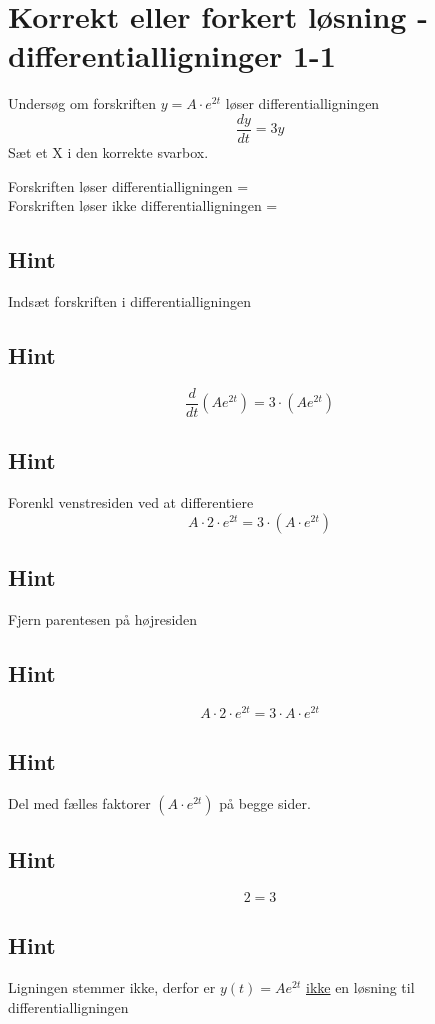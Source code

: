 \documentclass{article}
\newenvironment{exercise}[1]{\newpage\section{#1}}{}
\newcommand{\answerbox}[1]{\fbox{$#1$}}
\newcommand{\hint}{\subsection*{Hint}}
\begin{document}
\tableofcontents
\newpage

\begin{exercise}{Korrekt eller forkert løsning - differentialligninger 1-1}


Undersøg om forskriften $y = A \cdot e^{2t}$ løser differentialligningen
\[
\frac{dy}{dt} = 3y
\]
Sæt et X i den korrekte svarbox.

Forskriften løser differentialligningen = \answerbox{} \\

Forskriften løser ikke differentialligningen = \answerbox{X}

\hint

Indsæt forskriften i differentialligningen

\hint
\[
\frac{d}{dt} \left( A e^{2t}\right) = 3 \cdot \left( A e^{2t} \right)
\]


\hint

Forenkl venstresiden ved at differentiere
\[
A \cdot 2 \cdot e^{2t} = 3 \cdot \left(A \cdot e^{2t} \right)
\]

\hint

Fjern parentesen på højresiden

\hint
\[
A \cdot 2 \cdot e^{2t} = 3 \cdot A \cdot e^{2t}
\]

\hint
Del med fælles faktorer $\left( A \cdot e^{2t} \right)$ på begge sider.

\hint

\[
2 = 3
\]


\hint

Ligningen stemmer ikke, derfor er $y(t) = A e^{2t}$ \underline{ikke} en løsning til differentialligningen

\end{exercise}

\newpage
\end{document}
